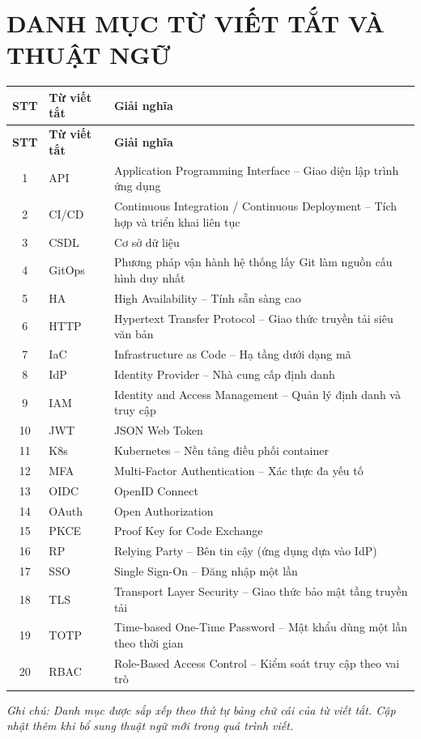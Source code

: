 \chapter*{DANH MỤC TỪ VIẾT TẮT VÀ THUẬT NGỮ}

\begin{longtable}{c l p{7.6cm}}
\toprule
\textbf{STT} & \textbf{Từ viết tắt} & \textbf{Giải nghĩa}\\
\midrule
\endfirsthead
\toprule
\textbf{STT} & \textbf{Từ viết tắt} & \textbf{Giải nghĩa}\\
\midrule
\endhead
1  & API   & Application Programming Interface -- Giao diện lập trình ứng dụng\\
2  & CI/CD & Continuous Integration / Continuous Deployment -- Tích hợp và triển khai liên tục\\
3  & CSDL  & Cơ sở dữ liệu\\
4  & GitOps & Phương pháp vận hành hệ thống lấy Git làm nguồn cấu hình duy nhất\\
5  & HA    & High Availability -- Tính sẵn sàng cao\\
6  & HTTP  & Hypertext Transfer Protocol -- Giao thức truyền tải siêu văn bản\\
7  & IaC   & Infrastructure as Code -- Hạ tầng dưới dạng mã\\
8  & IdP   & Identity Provider -- Nhà cung cấp định danh\\
9  & IAM   & Identity and Access Management -- Quản lý định danh và truy cập\\
10 & JWT   & JSON Web Token\\
11 & K8s   & Kubernetes -- Nền tảng điều phối container\\
12 & MFA   & Multi-Factor Authentication -- Xác thực đa yếu tố\\
13 & OIDC  & OpenID Connect\\
14 & OAuth & Open Authorization\\
15 & PKCE  & Proof Key for Code Exchange\\
16 & RP    & Relying Party -- Bên tin cậy (ứng dụng dựa vào IdP)\\
17 & SSO   & Single Sign-On -- Đăng nhập một lần\\
18 & TLS   & Transport Layer Security -- Giao thức bảo mật tầng truyền tải\\
19 & TOTP  & Time-based One-Time Password -- Mật khẩu dùng một lần theo thời gian\\
20 & RBAC  & Role-Based Access Control -- Kiểm soát truy cập theo vai trò\\
\bottomrule
\end{longtable}

\vspace{0.5cm}
\textit{Ghi chú: Danh mục được sắp xếp theo thứ tự bảng chữ cái của từ viết tắt.
Cập nhật thêm khi bổ sung thuật ngữ mới trong quá trình viết.}
